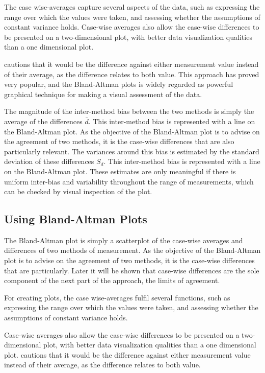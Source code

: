 \documentclass[Main.tex]{subfiles}
\begin{document}
The case wise-averages capture several aspects of the data, such as expressing the range over which the values were taken, and assessing whether the assumptions of constant variance holds.
Case-wise averages also allow the case-wise differences to be presented on a two-dimensional plot, with better data visualization qualities than a one dimensional plot. 

\citet{BA86} cautions that it would be the difference against either measurement value instead of their average, as the difference relates to both value. This approach has proved very popular, and the Bland-Altman plots is widely regarded as powerful graphical technique for making a visual assessment of the data.

The magnitude of the inter-method bias between the two methods is simply the average of the differences $\bar{d}$. This inter-method bias is represented with a line on the Bland-Altman plot. As the objective of the Bland-Altman plot is to advise on the agreement of two methods, it is the case-wise differences that are also particularly relevant. The variances around this bias is estimated by the standard deviation of these differences $S_{d}$. This inter-method bias is represented with a	line on the Bland-Altman plot. These estimates are only meaningful	if there is uniform inter-bias and variability throughout the range of measurements, which can be checked by visual inspection of the plot. 

\subsection{Using Bland-Altman Plots}
	
The Bland-Altman plot is simply a scatterplot of the case-wise
	averages and differences of two methods of measurement. As the
	objective of the Bland-Altman plot is to advise on the agreement
	of two methods, it is the case-wise differences that are particularly. Later it will be shown that case-wise differences are the sole component of the next part of the approach, the
	limits of agreement.
	
For creating plots, the case wise-averages fulfil several
	functions, such as expressing the range over which the values were
	taken, and assessing whether the assumptions of constant variance
	holds. 
	
Case-wise averages also allow the case-wise differences to be presented on a two-dimensional plot, with better data visualization qualities than a one dimensional plot. \citet{BA86} cautions that it would be the difference against either measurement value instead of their average, as the difference
	relates to both value.
\end{document}
